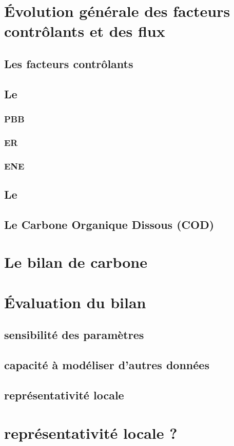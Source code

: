 \section{Évolution générale des facteurs contrôlants et des flux}

\subsection{Les facteurs contrôlants}

\subsection{Le \coo}
\subsubsection{PBB}
\subsubsection{ER}
\subsubsection{ENE}
\subsection{Le \chh}
\subsection{Le Carbone Organique Dissous (COD)}

\section{Le bilan de carbone}

\section{Évaluation du bilan}

\subsection{sensibilité des paramètres}

\subsection{capacité à modéliser d'autres données}

\subsection{représentativité locale}

\section{représentativité locale ?}